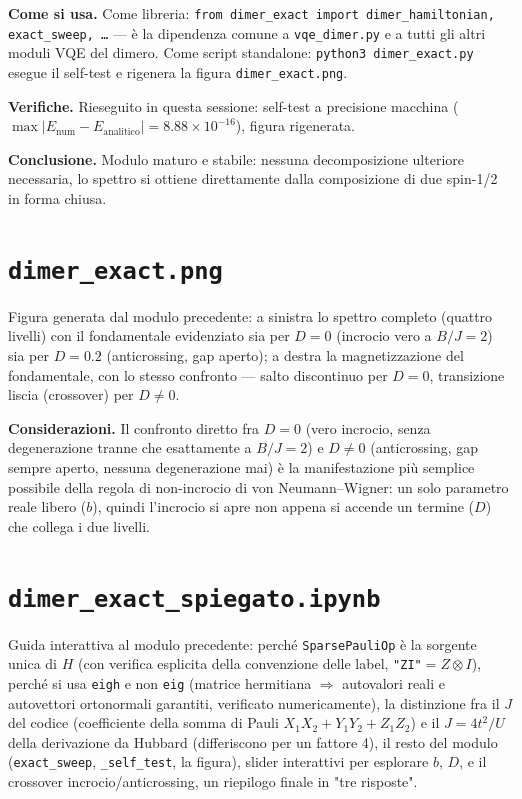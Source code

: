 \documentclass[11pt,a4paper]{article}
\begin{document}
\textbf{Come si usa.} Come libreria: \texttt{from dimer\_exact import
dimer\_hamiltonian, exact\_sweep, \ldots} — è la dipendenza comune a
\texttt{vqe\_dimer.py} e a tutti gli altri moduli VQE del dimero. Come script
standalone: \texttt{python3 dimer\_exact.py} esegue il self-test e rigenera la
figura \texttt{dimer\_exact.png}.

\textbf{Verifiche.} Rieseguito in questa sessione: self-test a precisione macchina
($\max|E_\text{num}-E_\text{analitico}|=8.88\times10^{-16}$), figura rigenerata.

\textbf{Conclusione.} Modulo maturo e stabile: nessuna decomposizione ulteriore
necessaria, lo spettro si ottiene direttamente dalla composizione di due spin-1/2 in
forma chiusa.

\section*{\texttt{dimer\_exact.png}}

Figura generata dal modulo precedente: a sinistra lo spettro completo (quattro
livelli) con il fondamentale evidenziato sia per $D=0$ (incrocio vero a $B/J=2$) sia
per $D=0.2$ (anticrossing, gap aperto); a destra la magnetizzazione del
fondamentale, con lo stesso confronto — salto discontinuo per $D=0$, transizione
liscia (crossover) per $D\neq0$.

\textbf{Considerazioni.} Il confronto diretto fra $D=0$ (vero incrocio, senza
degenerazione tranne che esattamente a $B/J=2$) e $D\neq0$ (anticrossing, gap sempre
aperto, nessuna degenerazione mai) è la manifestazione più semplice possibile della
regola di non-incrocio di von Neumann–Wigner: un solo parametro reale libero ($b$),
quindi l'incrocio si apre non appena si accende un termine ($D$) che collega i due
livelli.

\section*{\texttt{dimer\_exact\_spiegato.ipynb}}

Guida interattiva al modulo precedente: perché \texttt{SparsePauliOp} è la sorgente
unica di $H$ (con verifica esplicita della convenzione delle label,
\texttt{"ZI"}$=Z\otimes I$), perché si usa \texttt{eigh} e non \texttt{eig} (matrice
hermitiana $\Rightarrow$ autovalori reali e autovettori ortonormali garantiti,
verificato numericamente), la distinzione fra il $J$ del codice (coefficiente della
somma di Pauli $X_1X_2+Y_1Y_2+Z_1Z_2$) e il $J=4t^2/U$ della derivazione da Hubbard
(differiscono per un fattore 4), il resto del modulo (\texttt{exact\_sweep},
\texttt{\_self\_test}, la figura), slider interattivi per esplorare $b$, $D$, e il
crossover incrocio/anticrossing, un riepilogo finale in "tre risposte".
\end{document}
